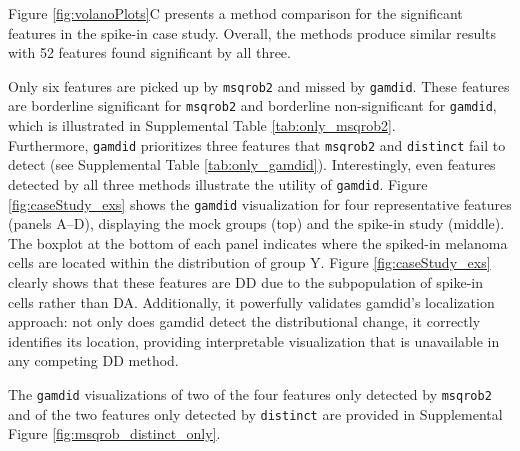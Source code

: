 Figure \ref{fig:volanoPlots}C presents a method comparison for
the significant features in the spike-in case study. Overall, the methods produce
similar results with 52 features found significant by all three.


Only six features are picked up by \texttt{msqrob2} and missed by \texttt{gamdid}.
These features are borderline significant for \texttt{msqrob2} and borderline
non-significant for \texttt{gamdid}, which is illustrated in Supplemental Table
\ref{tab:only_msqrob2}.\\
Furthermore, \texttt{gamdid} prioritizes three features that \texttt{msqrob2}
and \texttt{distinct} fail to detect (see Supplemental Table \ref{tab:only_gamdid}).
Interestingly, even features detected by all three methods illustrate the utility
of \texttt{gamdid}. Figure \ref{fig:caseStudy_exs} shows the
\texttt{gamdid} visualization for four representative features (panels A--D), displaying the
mock groups (top) and the spike-in study (middle). The boxplot at the bottom of each panel
indicates where the spiked-in melanoma cells are
located within the distribution of group Y. Figure \ref{fig:caseStudy_exs} clearly
shows that these features are DD due to the subpopulation of spike-in cells rather
than DA. Additionally, it powerfully validates gamdid’s localization approach:
not only does gamdid detect the distributional change, it correctly identifies
its location, providing interpretable visualization that is unavailable in any
competing DD method.


The \texttt{gamdid} visualizations of two of the four features
only detected by \texttt{msqrob2} and of the two features only detected by
\texttt{distinct} are provided in
Supplemental Figure \ref{fig:msqrob_distinct_only}.

